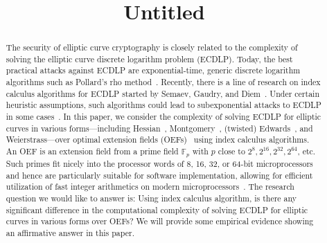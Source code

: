 \documentclass{llncs}
\newcommand{\F}[1]{\ensuremath{\mathbb F_{#1}}}
\begin{document}
%
\title{Untitled}
%
%
%
%

\maketitle              %

\begin{abstract}
%
  The security of elliptic curve cryptography is closely related to
  the complexity of solving the elliptic curve discrete logarithm
  problem (ECDLP).
%
  Today, the best practical attacks against ECDLP are
  exponential-time, generic discrete logarithm algorithms such as
  Pollard's rho method~\cite{1978-pollard-kangaroo}.
%
  Recently, there is a line of research on index calculus algorithms
  for ECDLP started by Semaev, Gaudry, and
  Diem~\cite{DBLP:journals/iacr/Semaev04,DBLP:journals/jsc/Gaudry09,DBLP:journals/moc/Diem11}.
%
  Under certain heuristic assumptions, such algorithms could lead to
  subexponential attacks to ECDLP in some
  cases~\cite{DBLP:conf/eurocrypt/FaugerePPR12,DBLP:journals/iacr/PetitQ12,DBLP:conf/iwsec/HuangPST13}.
%
  In this paper, we consider the complexity of solving ECDLP for
  elliptic curves in various forms---including
  Hessian~\cite{DBLP:conf/ches/Smart01},
  Montgomery~\cite{1987-montgomery}, (twisted)
  Edwards~\cite{DBLP:journals/iacr/BernsteinL07,DBLP:journals/iacr/BernsteinBJLP08},
  and Weierstrass---over optimal extension fields
  (OEFs)~\cite{DBLP:conf/crypto/BaileyP98} using index calculus
  algorithms.
%
  An OEF is an extension field from a prime field \F p with $p$ close
  to $2^8, 2^{16}, 2^{32}, 2^{64}$, etc.
%
  Such primes fit nicely into the processor words of 8, 16, 32, or
  64-bit microprocessors and hence are particularly suitable for
  software implementation, allowing for efficient utilization of fast
  integer arithmetics on modern
  microprocessors~\cite{DBLP:conf/crypto/BaileyP98}.
%
  The research question we would like to answer is: Using index
  calculus algorithm, is there any significant difference in the
  computational complexity of solving ECDLP for elliptic curves in
  various forms over OEFs?
%
  We will provide some empirical evidence showing an affirmative
  answer in this paper.
%
\end{abstract}







%
%


\end{document}
